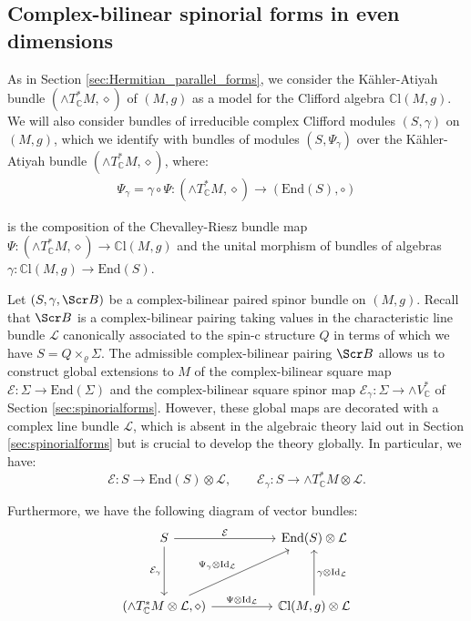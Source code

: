 \documentclass[10pt,a4paper,twoside,reqno]{amsart}
\theoremstyle{plain}
\theoremstyle{definition}
\theoremstyle{remark}
\newcommand{\End}{\mathrm{End}}
\def\C{\mathbb{C}}
\def\Id{\mathrm{Id}}
\def\scB{\Scr B}
\def\cE{\mathcal{E}}
\def\mCl{\mathbb{C}\mathrm{l}}
\def\cL{\mathcal{L}}
\begin{document}

\subsection{Complex-bilinear spinorial forms in even dimensions}


As in Section \ref{sec:Hermitian_parallel_forms}, we consider the Kähler-Atiyah bundle $(\wedge T^*_\C M,\diamond)$ of $(M,g)$ as a model for the Clifford algebra $\mCl(M,g)$. We will also consider bundles of irreducible complex Clifford modules $(S,\gamma)$ on $(M,g)$, which we identify with bundles of modules $(S,\Psi_\gamma)$ over the Kähler-Atiyah bundle $(\wedge T^*_\C M,\diamond)$, where: 
\begin{eqnarray*}
\Psi_\gamma=\gamma\circ\Psi\colon(\wedge T^*_\C M,\diamond)\to(\End(S),\circ)    
\end{eqnarray*}

is the composition of the Chevalley-Riesz bundle map $\Psi\colon(\wedge T^*_\C M,\diamond)\to\mCl(M,g)$ and the unital morphism of bundles of algebras $\gamma\colon\mCl(M,g)\to\End(S)$.\medskip

Let $(S,\gamma,\scB)$ be a complex-bilinear paired spinor bundle on $(M,g)$. Recall that $\scB$ is a complex-bilinear pairing taking values in the characteristic line bundle $\cL$ canonically associated to the spin-c structure $Q$ in terms of which we have $S = Q \times_{\varrho} \Sigma$. The admissible complex-bilinear pairing $\scB$ allows us to construct global extensions to $M$ of the complex-bilinear square map $\cE\colon\Sigma\to\End(\Sigma)$ and the complex-bilinear square spinor map $\cE_\gamma\colon\Sigma\to\wedge V^*_\C$ of Section \ref{sec:spinorialforms}. However, these global maps are decorated with a complex line bundle $\cL$, which is absent in the algebraic theory laid out in Section \ref{sec:spinorialforms} but is crucial to develop the theory globally. In particular, we have:
\begin{equation*}
\cE\colon S\to\End(S)\otimes\cL,\qquad \cE_\gamma\colon S\to\wedge T^*_\C M\otimes\cL.
\end{equation*}

Furthermore, we have the following diagram of vector bundles: $$\begin{tikzcd}
S \arrow[rr, "\mathcal{E}"] \arrow[dd, "\mathcal{E}_\gamma"'] &  & \mathrm{End}(S)\otimes\cL                                   \\
                                                                                                &  &                                                   \\
{(\wedge T^*_{\mathbb{C}}M\otimes\cL,\diamond)} \arrow[rr, "\Psi\otimes\Id_{\cL}"] \arrow[rruu, "\Psi_\gamma\otimes\Id_{\cL}"]            &  & {\mathbb{C}\mathrm{l}(M,g)\otimes\cL} \arrow[uu, "\gamma\otimes\Id_{\cL}"']
\end{tikzcd}$$
\end{document}

